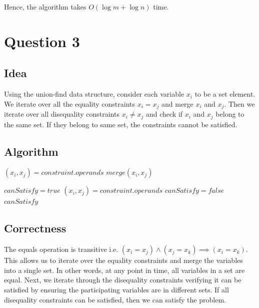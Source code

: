 \documentclass{article}
\begin{document}
    Hence, the algorithm takes $O(\log m + \log n)$ time.

    \section*{Question 3}

    \subsection*{Idea}
    Using the union-find data structure, consider each variable $x_i$ to be a set element. We iterate over all the equality constraints $x_i = x_j$ and merge $x_i$ and $x_j$. Then we iterate over all disequality constraints $x_i \neq x_j$ and check if $x_i$ and $x_j$ belong to the same set. If they belong to same set, the constraints cannot be satisfied.
    
    \subsection*{Algorithm}
        \begin{algorithm}[H]
            \begin{algorithmic}
                            \State $(x_i, x_j) = constraint.operands$
                            \State $merge(x_i, x_j)$
                        \EndIf
                    \EndFor

                    \State $canSatisfy = true$
                            \State $(x_i, x_j) = constraint.operands$
                                \State $canSatisfy = false$
                            \EndIf
                        \EndIf
                    \EndFor
                    \Return $canSatisfy$
                \EndProcedure
            \end{algorithmic}
        \end{algorithm}

    \subsection*{Correctness}
    The equals operation is transitive i.e. $(x_i = x_j) \land (x_j = x_k) \implies (x_i = x_k)$. This allows us to iterate over the equality constraints and merge the variables into a single set. In other words, at any point in time, all variables in a set are equal. Next, we iterate through the disequality constraints verifying it can be satisfied by ensuring the participating variables are in different sets. If all disequality constraints can be satisfied, then we can satisfy the problem.
\end{document}

